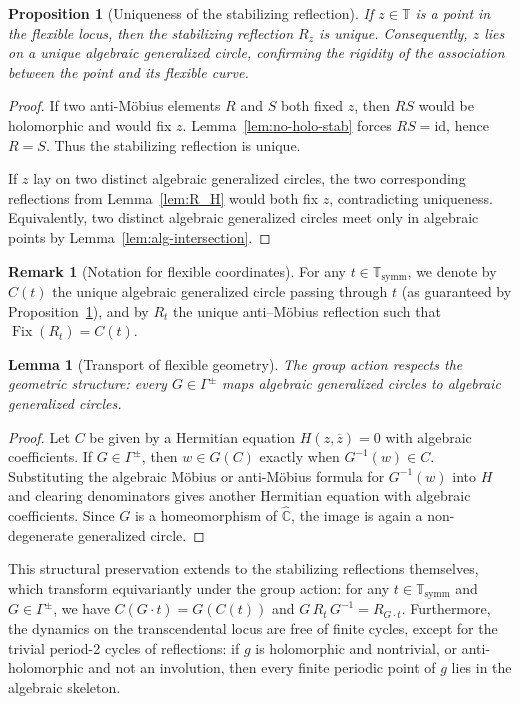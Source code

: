 \documentclass[11pt,a4paper]{article}
\theoremstyle{plain}
\newtheorem{lemma}[theorem]{Lemma}
\newtheorem{proposition}[theorem]{Proposition}
\theoremstyle{definition}
\newtheorem{remark}[theorem]{Remark}
\newcommand{\id}{\mathrm{id}}
\newcommand{\rsphere}{\hat{\mathbb{C}}}
\newcommand{\trans}{\mathbb{T}}
\newcommand{\Tc}{\trans}
\DeclareMathOperator{\Fix}{Fix}
\newcommand{\ssymm}{\Tc_{\mathrm{symm}}}
\begin{document}
\begin{proposition}[Uniqueness of the stabilizing reflection]\label{prop:unique-reflection}
	If $z\in\Tc$ is a point in the flexible locus, then the stabilizing reflection $R_z$ is unique. Consequently, $z$ lies on a unique algebraic generalized circle, confirming the rigidity of the association between the point and its flexible curve.
\end{proposition}
\begin{proof}
	If two anti-Möbius elements $R$ and $S$ both fixed $z$, then $RS$ would be holomorphic and would fix $z$. Lemma~\ref{lem:no-holo-stab} forces $RS=\id$, hence $R=S$. Thus the stabilizing reflection is unique.
	
	If $z$ lay on two distinct algebraic generalized circles, the two corresponding reflections from Lemma~\ref{lem:R_H} would both fix $z$, contradicting uniqueness. Equivalently, two distinct algebraic generalized circles meet only in algebraic points by Lemma~\ref{lem:alg-intersection}.
\end{proof}

\begin{remark}[Notation for flexible coordinates]\label{rem:CtRt}
	For any $t\in\ssymm$, we denote by $C(t)$ the unique algebraic generalized circle passing through $t$ (as guaranteed by Proposition~\ref{prop:unique-reflection}), and by $R_t$ the unique anti–Möbius reflection such that $\Fix(R_t)=C(t)$.
\end{remark}

\begin{lemma}[Transport of flexible geometry]\label{lem:G-preserves-circles}
	The group action respects the geometric structure: every $G\in\Gamma^{\pm}$ maps algebraic generalized circles to algebraic generalized circles.
\end{lemma}
\begin{proof}
	Let $C$ be given by a Hermitian equation $H(z,\overline z)=0$ with algebraic coefficients. If $G\in\Gamma^{\pm}$, then $w\in G(C)$ exactly when $G^{-1}(w)\in C$. Substituting the algebraic Möbius or anti-Möbius formula for $G^{-1}(w)$ into $H$ and clearing denominators gives another Hermitian equation with algebraic coefficients. Since $G$ is a homeomorphism of $\rsphere$, the image is again a non-degenerate generalized circle.
\end{proof}

This structural preservation extends to the stabilizing reflections themselves, which transform equivariantly under the group action: for any $t\in\ssymm$ and $G\in\Gamma^{\pm}$, we have $C(G\cdot t)=G(C(t))$ and $G\,R_{t}\,G^{-1}=R_{G\cdot t}$. Furthermore, the dynamics on the transcendental locus are free of finite cycles, except for the trivial period-2 cycles of reflections: if $g$ is holomorphic and nontrivial, or anti-holomorphic and not an involution, then every finite periodic point of $g$ lies in the algebraic skeleton.
\end{document}

